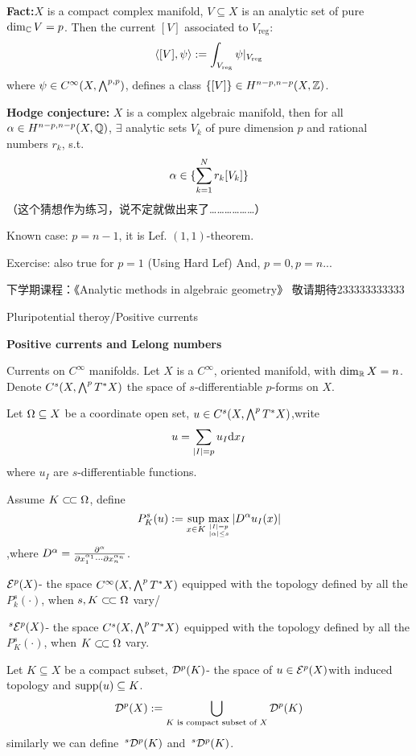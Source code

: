 \textbf{Fact:}$X$ is a compact complex manifold,
$V\subseteq X$ is an analytic set of pure
$\dim_{\mathbb{C}}V=p$. Then the current $[V]$ associated
to $V_{\text{reg}}$:
$$
  \langle [V],\psi \rangle
:=
  \int_{V_{\text{reg}}}
    \psi|_{V_{\text{reg}}}
$$
where $\psi\in C^\infty(X,\bigwedge\nolimits^{p,p})$,
defines a class
$\{[V]\}\in H^{n-p,n-p}(X,\mathbb{Z})$.

\textbf{Hodge conjecture:} $X$ is a complex algebraic manifold,
then for all $\alpha\in H^{n-p,n-p}(X,\mathbb{Q})$,
$\exists$ analytic sets $V_k$ of pure dimension $p$ and
rational numbers $r_k$, s.t.
$$
  \alpha\in
  \{\sum_{k=1}^Nr_k[V_k]\}
$$
（这个猜想作为练习，说不定就做出来了………………）

Known case: $p=n-1$, it is Lef. $(1,1)$-theorem.

Exercise: also true for $p=1$ (Using Hard Lef)
And, $p=0,p=n$...\vspp

下学期课程：《Analytic methods in algebraic geometry》
敬请期待233333333333

Pluripotential theroy/Positive currents



\textbf{Positive currents and Lelong numbers}

Currents on $C^\infty$ manifolds. Let $X$ is a $C^\infty$,
oriented manifold, with $\dim_{\mathbb{R}}X=n$.
Denote $C^s(X,\bigwedge\nolimits^{p}T^*X)$ the space
of $s$-differentiable $p$-forms on $X$.

Let $\Omega\subseteq X$ be a coordinate open set,
$u\in C^s(X,\bigwedge\nolimits^{p}T^*X)$,write
$$u=\sum_{|I|=p} u_I\mathrm{d} x_I$$
where $u_I$ are $s$-differentiable functions.

Assume $K\subset\!\subset\Omega$, define
$$
  P^s_K(u)
:=
  \sup_{x\in K}
    \max_{|I|=p\atop|\alpha|\leq s}
      |D^\alpha u_I(x)|
$$
,where $D^\alpha=\frac{\partial^\alpha}{\partial x_1^{\alpha_1}\cdots\partial x_n^{\alpha_n}}$.

$\mathcal{E}^p(X)$- the space $C^\infty(X,\bigwedge\nolimits^{p}T^*X)$
equipped with the topology defined by all the
$P^s_k(\cdot)$, when $s,K\subset\!\subset\Omega$ vary/

$\,^s\mathcal{E}^p(X)$- the space $C^s(X,\bigwedge\nolimits^{p}T^*X)$
equipped with the topology defined by all the
$P^s_K(\cdot)$, when $K\subset\!\subset\Omega$ vary.

Let $K\subseteq X$ be a compact subset,
$\mathcal{D}^p(K)$- the space of $u\in\mathcal{E}^p(X)$with induced topology
and $\operatorname{supp}(u)\subseteq K$.
$$\mathcal{D}^p(X):=\bigcup_{K\text{ is compact subset of $X$}}
\mathcal{D}^p(K)$$
similarly we can define $\,^s\mathcal{D}^p(K)$ and $\,^s\mathcal{D}^p(K)$.

